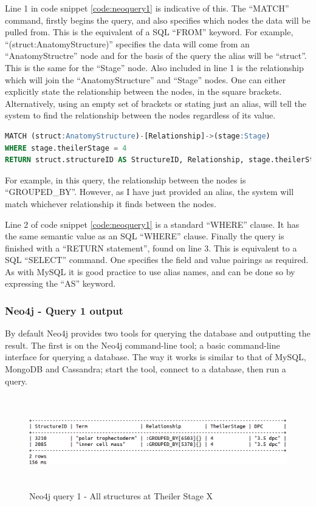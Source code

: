 Line 1 in code snippet \ref{code:neoquery1} is indicative of this. The ``MATCH'' command, firstly begins the query, and also specifies which nodes the data will be pulled from. This is the equivalent of a SQL ``FROM'' keyword. For example, ``(struct:AnatomyStructure)'' specifies the data will come from an ``AnatomyStructre'' node and for the basis of the query the alias will be ``struct''. This is the same for the ``Stage'' node. Also included in line 1 is the relationship which will join the ``AnatomyStructure'' and ``Stage'' nodes. One can either explicitly state the relationship between the nodes, in the square brackets. Alternatively, using an empty set of brackets or stating just an alias, will tell the system to find the relationship between the nodes regardless of its value.
\begin{lstlisting}[language=SQL, caption=Neo4j query 1 statement. All structures at Theiler Stage X., label=code:neoquery1]
MATCH (struct:AnatomyStructure)-[Relationship]->(stage:Stage)
WHERE stage.theilerStage = 4
RETURN struct.structureID AS StructureID, Relationship, stage.theilerStage AS TheilerStage, stage.dpc AS DPC;
\end{lstlisting}
\parindent 0pt
For example, in this query, the relationship between the nodes is ``GROUPED\_BY''. However, as I have just provided an alias, the system will match whichever relationship it finds between the nodes.

\parindent 15pt
Line 2 of code snippet \ref{code:neoquery1} is a standard ``WHERE'' clause. It has the same semantic value as an SQL ``WHERE'' clause. Finally the query is finished with a ``RETURN statement'', found on line 3. This is equivalent to a SQL ``SELECT'' command. One specifies the field and value pairings as required. As with MySQL it is good practice to use alias names, and can be done so by expressing the ``AS'' keyword.

\subsubsection*{Neo4j - Query 1 output}\label{neoquery1output}
By default Neo4j provides two tools for querying the database and outputting the result. The first is on the Neo4j command-line tool; a basic command-line interface for querying a database. The way it works is similar to that of MySQL, MongoDB and Cassandra; start the tool, connect to a database, then run a query.

\begin{figure}[H]\begin{center}\includegraphics[height=4cm,width=0.9\linewidth]{images/neo4jquery1terminal}\caption{Neo4j query 1 - All structures at Theiler Stage X}\label{fig:neo4jquery1terminal}\end{center}\end{figure}

